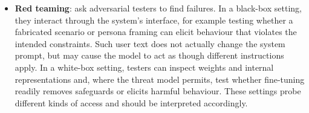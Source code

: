 \begin{itemize}
  \item \textbf{Red teaming}: ask adversarial testers to find failures. In a black-box setting, they interact through the system's interface, for example testing whether a fabricated scenario or persona framing can elicit behaviour that violates the intended constraints. Such user text does not actually change the system prompt, but may cause the model to act as though different instructions apply. In a white-box setting, testers can inspect weights and internal representations and, where the threat model permits, test whether fine-tuning readily removes safeguards or elicits harmful behaviour. These settings probe different kinds of access and should be interpreted accordingly.
\end{itemize}
